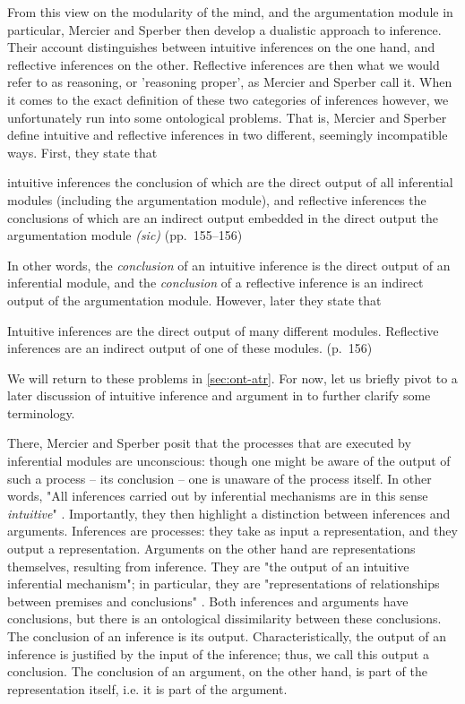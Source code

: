 From this view on the modularity of the mind, and the argumentation module in particular, Mercier and Sperber then develop a dualistic approach to inference.
Their account distinguishes between intuitive inferences on the one hand, and reflective inferences on the other. Reflective inferences are then what we would refer to as reasoning, or 'reasoning proper', as Mercier and Sperber call it.
When it comes to the exact definition of these two categories of inferences however, we unfortunately run into some ontological problems.
That is, Mercier and Sperber define intuitive and reflective inferences in two different, seemingly incompatible ways. First, they state that
\begin{quoting}
    intuitive inferences the conclusion of which are the direct output of all inferential modules (including the argumentation module), and reflective inferences the conclusions of which are an indirect output embedded in the direct output the argumentation module \emph{(sic)}
    \hfill (pp.~155--156)
\end{quoting}
In other words, the \emph{conclusion} of an intuitive inference is the direct output of an inferential module, and the \emph{conclusion} of a reflective inference is an indirect output of the argumentation module. However, later they state that
\begin{quoting}
    Intuitive inferences are the direct output of many different modules. Reflective inferences are an indirect output of one of these modules.
    \hfill (p.~156)
\end{quoting}
We will return to these problems in \cref{sec:ont-atr}.
For now, let us briefly pivot to a later discussion of intuitive inference and argument in \citet[\S 1.1]{MS11} to further clarify some terminology.

There, Mercier and Sperber posit that the processes that are executed by inferential modules are unconscious: though one might be aware of the output of such a process -- its conclusion -- one is unaware of the process itself. In other words, "All inferences carried out by inferential mechanisms are in this sense \emph{intuitive}" \citep[p.~58]{MS11}.
Importantly, they then highlight a distinction between inferences and arguments.
Inferences are processes: they take as input a representation, and they output a representation.
Arguments on the other hand are representations themselves, resulting from inference. They are "the output of an intuitive inferential mechanism"; in particular, they are "representations of relationships between premises and conclusions" \citep[p.~58]{MS11}.
Both inferences and arguments have conclusions, but there is an ontological dissimilarity between these conclusions.
The conclusion of an inference is its output. Characteristically, the output of an inference is justified by the input of the inference; thus, we call this output a conclusion.
The conclusion of an argument, on the other hand, is part of the representation itself, i.e. it is part of the argument.


